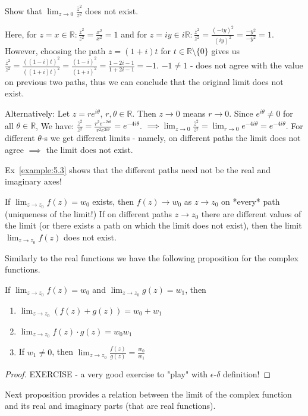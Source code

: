 \begin{example}\label{example:5.3}
    Show that $\lim_{z \to 0} \frac{\bar{z}^2}{z^2}$ does not exist.
\begin{soln} Here, for $z = x \in \mathbb{R}:  \frac{\bar{z}^2}{z^2} = \frac{x^2}{x^2} = 1$ and for $z=iy \in i\mathbb{R}: \frac{\bar{z}^2}{z^2} = \frac{(-iy)^2}{(iy)^2} = \frac{-y^2}{-y^2}=1$. 
    However, choosing the path $z=(1+i)t$ for $t \in \mathbb{R} \setminus \{0\}$ gives us $\frac{\bar{z}^2}{z^2}=\frac{((1-i)t)^2}{((1+i)t)^2} = \frac{(1-i)^2}{(1+i)^2} = \frac{1-2i-1}{1+2i-1}=-1$. $-1 \neq 1$ - does not agree with the value on previous two paths, 
    thus we can conclude that the original limit does not exist.
\end{soln}
\end{example}

Alternatively: Let $z = re^{i\theta}$, $r, \theta \in \mathbb{R}$. Then $z \to 0$ means $r \to 0$. Since $e^{i\theta} \neq 0$ for all $\theta \in \mathbb{R}$, We have: $\frac{\bar{z}^2}{z^2} = \frac{r^2 e^{-2i\theta}}{r^2 e^{2i\theta}} = e^{-4i\theta}$.
$\implies \lim_{z \to 0} \frac{\bar{z}^2}{z^2} = \lim_{r \to 0} e^{-4i\theta} = e^{-4i\theta}$. For different $\theta$-s we get different limits - namely, 
on different paths the limit does not agree $\implies$ the limit does not exist.

\begin{example}
Ex~\ref{example:5.3} shows that the different paths need not be the real and imaginary axes!
\end{example}

\begin{remark} 
    If $\lim_{z \to z_0} f(z) = w_0$ exists, then $f(z) \to w_0$ as $z \to z_0$ on *every* path (uniqueness of the limit!) 
    If on different paths $z \to z_0$ there are different values of the limit (or there exists a path on which the limit does not exist), then the limit $\lim_{z \to z_0} f(z)$ does not exist.
\end{remark}
Similarly to the real functions we have the following proposition for the complex functions.

\begin{proposition} \label{proposition:3.1} If $\lim_{z \to z_0} f(z) = w_0$ and $\lim_{z \to z_0} g(z) = w_1$, then
\begin{enumerate}
    \item $\lim_{z \to z_0} (f(z) + g(z)) = w_0 + w_1$
    \item $\lim_{z \to z_0} f(z) \cdot g(z) = w_0 w_1$
    \item If $w_1 \neq 0$, then $\lim_{z \to z_0} \frac{f(z)}{g(z)} = \frac{w_0}{w_1}$
\end{enumerate}

\begin{proof} EXERCISE - a very good exercise to "play" with $\epsilon$-$\delta$ definition! \end{proof}
\end{proposition}
Next proposition provides a relation between the limit of the complex function and its real and imaginary parts (that are real functions).

